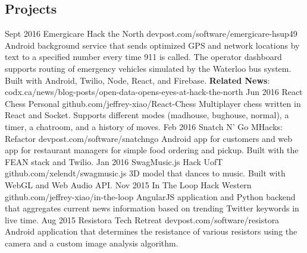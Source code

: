 \documentclass{resume}
\begin{document}
\begin{main}
		\section{Projects}
			\begin{entrylist}
				\rightentry%
					{Sept 2016}%
					{Emergicare}%
					{Hack the North}%
					{devpost.com/software/emergicare-hsup49}%
					{Android background service that sends optimized GPS and network locations by text to a specified number every time 911 is called. The operator dashboard supports routing of emergency vehicles simulated by the Waterloo bus system. Built with Android, Twilio, Node, React, and Firebase. \textbf{Related News}: \color{lightred}codx.ca/news/blog-posts/open-data-opens-eyes-at-hack-the-north}
				\rightentry%
					{Jun 2016}%
					{React Chess}%
					{Personal}%
					{github.com/jeffrey-xiao/React-Chess}%
					{Multiplayer chess written in React and Socket. Supports different modes (madhouse, bughouse, normal), a timer, a chatroom, and a history of moves.}
				\rightentry%
					{Feb 2016}%
					{Snatch N' Go}%
					{MHacks: Refactor}%
					{devpost.com/software/snatchngo}%
					{Android app for customers and web app for restaurant managers for simple food ordering and pickup. Built with the FEAN stack and Twilio.}
				\rightentry%
					{Jan 2016}%
					{SwagMusic.js}%
					{Hack UofT}%
					{github.com/xelendt/swagmusic.js}%
					{3D model that dances to music. Built with WebGL and Web Audio API.}
				\rightentry%
					{Nov 2015}%
					{In The Loop}%
					{Hack Western}%
					{github.com/jeffrey-xiao/in-the-loop}%
					{AngularJS application and Python backend that aggregates current news information based on trending Twitter keywords in live time.}
				\rightentry%
					{Aug 2015}%
					{Resistora}%
					{Tech Retreat}%
					{devpost.com/software/resistora}%
					{Android application that determines the resistance of various resistors using the camera and a custom image analysis algorithm.}
			\end{entrylist}	
	\end{main}
\end{document}

